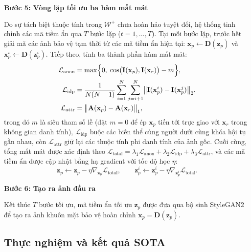 \documentclass[oneside,a4paper,12pt]{extarticle}
\begin{document}
\par\medskip\noindent\textbf{Bước 5: Vòng lặp tối ưu ba hàm mất mát}\par\smallskip
Do sự tách biệt thuộc tính trong $\mathcal{W}^+$ chưa hoàn hảo tuyệt đối, hệ thống tinh chỉnh các mã tiềm ẩn qua $T$ bước lặp ($t = 1, \dots, T$). Tại mỗi bước lặp, trước hết giải mã các ảnh bảo vệ tạm thời từ các mã tiềm ẩn hiện tại: $\mathbf{x}_p \leftarrow \mathbf{D}(\mathbf{z}_p)$ và $\mathbf{x}_p^i \leftarrow \mathbf{D}(\mathbf{z}_p^i)$. Tiếp theo, tính ba thành phần hàm mất mát:
\begin{align}
\mathcal{L}_{\text{anon}} &= \max\Bigl\{0,\; \cos\bigl(\mathbf{I}(\mathbf{x}_p), \mathbf{I}(\mathbf{x}_r)\bigr) - m\Bigr\}, \\
\mathcal{L}_{\text{idp}} &= \frac{1}{N(N-1)} \sum_{i=1}^{N} \sum_{j=i+1}^{N} \bigl\| \mathbf{I}(\mathbf{x}_p^i) - \mathbf{I}(\mathbf{x}_p^j) \bigr\|_2, \\
\mathcal{L}_{\text{attr}} &= \bigl\| \mathbf{A}(\mathbf{x}_p) - \mathbf{A}(\mathbf{x}_r) \bigr\|_1,
\end{align}
trong đó $m$ là siêu tham số lề (đặt $m = 0$ để ép $\mathbf{x}_p$ tiến tới trực giao với $\mathbf{x}_r$ trong không gian danh tính), $\mathcal{L}_{\text{idp}}$ buộc các biến thể cùng người dưới cùng khóa hội tụ gần nhau, còn $\mathcal{L}_{\text{attr}}$ giữ lại các thuộc tính phi danh tính của ảnh gốc. Cuối cùng, tổng mất mát được xác định theo $\mathcal{L}_{\text{total}} = \lambda_1 \mathcal{L}_{\text{anon}} + \lambda_2 \mathcal{L}_{\text{idp}} + \lambda_3 \mathcal{L}_{\text{attr}}$, và các mã tiềm ẩn được cập nhật bằng hạ gradient với tốc độ học $\eta$:
\[
\mathbf{z}_p \leftarrow \mathbf{z}_p - \eta \nabla_{\mathbf{z}_p} \mathcal{L}_{\text{total}}, \qquad \mathbf{z}_p^i \leftarrow \mathbf{z}_p^i - \eta \nabla_{\mathbf{z}_p^i} \mathcal{L}_{\text{total}}.
\]

\par\medskip\noindent\begin{minipage}{\textwidth}
\textbf{Bước 6: Tạo ra ảnh đầu ra}\par\nopagebreak\smallskip
Kết thúc $T$ bước tối ưu, mã tiềm ẩn tối ưu $\mathbf{z}_p$ được đưa qua bộ sinh StyleGAN2 để tạo ra ảnh khuôn mặt bảo vệ hoàn chỉnh $\mathbf{x}_p = \mathbf{D}(\mathbf{z}_p)$.
\end{minipage}
\par
\endgroup

\subsection{Thực nghiệm và kết quả SOTA}
\label{sec::thuc-nghiem}
\end{document}

